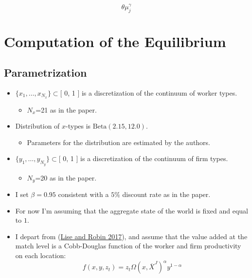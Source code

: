 \documentclass[
  letterpaper,
  DIV=11,
  numbers=noendperiod]{scrreprt}
\providecommand{\tightlist}{%
  \setlength{\itemsep}{0pt}\setlength{\parskip}{0pt}}\usepackage{longtable,booktabs,array}
\begin{document}
\[\theta\mu_j^{\gamma}\]


\hypertarget{computation-of-the-equilibrium}{%
\chapter{Computation of the
Equilibrium}\label{computation-of-the-equilibrium}}

\hypertarget{parametrization}{%
\section{Parametrization}\label{parametrization}}

\begin{itemize}
\item
  \(\{x_1,\ldots,x_{N_x}\}\subset[\) 0, 1 \(]\) is a discretization of
  the continuum of worker types.

  \begin{itemize}
  \tightlist
  \item
    \(N_x\)=21 as in the paper.
  \end{itemize}
\item
  Distribution of \(x\)-types is \(\text{Beta}(2.15, 12.0)\).

  \begin{itemize}
  \tightlist
  \item
    Parameters for the distribution are estimated by the authors.
  \end{itemize}
\item
  \(\{y_1,\ldots,y_{N_y}\}\subset[\) 0, 1 \(]\) is a discretization of
  the continuum of firm types.

  \begin{itemize}
  \tightlist
  \item
    \(N_y\)=20 as in the paper.
  \end{itemize}
\item
  I set \(\beta=0.95\) consistent with a \(5\%\) discount rate as in the
  paper.
\item
  For now I'm assuming that the aggregate state of the world is fixed
  and equal to \(1\).
\item
  I depart from
  (\protect\hyperlink{ref-liseMacrodynamicsSortingWorkers2017}{Lise and
  Robin 2017}), and assume that the value added at the match level is a
  Cobb-Douglas function of the worker and firm productivity on each
  location:
  \[f(x,y,z_t) = z_t \Omega\left(x, \overline{X}^J\right)^\alpha y^{1-\alpha}\]


\end{itemize}
\end{document}
